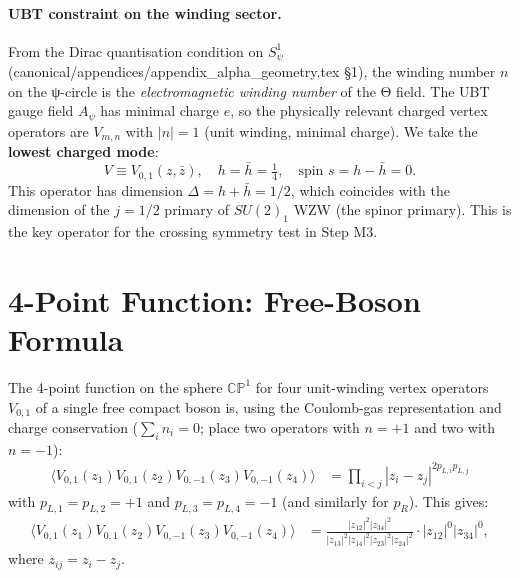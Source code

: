 \documentclass[12pt,a4paper]{article}
\theoremstyle{definition}
\theoremstyle{remark}
\begin{document}
\paragraph{UBT constraint on the winding sector.}
From the Dirac quantisation condition on $S^1_\psi$
(canonical/appendices/appendix\_alpha\_geometry.tex \S1), the winding number
$n$ on the ψ-circle is the \emph{electromagnetic winding number} of the
Θ field.  The UBT gauge field $A_\psi$ has minimal charge $e$, so the
physically relevant charged vertex operators are $V_{m,n}$ with $|n| = 1$
(unit winding, minimal charge).  We take the \textbf{lowest charged mode}:
\begin{equation}
  V \equiv V_{0,1}(z, \bar{z}),
  \quad h = \bar{h} = \tfrac{1}{4},
  \quad \text{spin } s = h - \bar{h} = 0.
  \label{eq:m2:lowestmode}
\end{equation}
This operator has dimension $\Delta = h + \bar{h} = 1/2$, which coincides with
the dimension of the $j = 1/2$ primary of $SU(2)_1$ WZW (the spinor primary).
This is the key operator for the crossing symmetry test in Step M3.

\section{4-Point Function: Free-Boson Formula}
\label{sec:m2:4point}

The 4-point function on the sphere $\mathbb{CP}^1$ for four unit-winding
vertex operators $V_{0,1}$ of a single free compact boson is, using the
Coulomb-gas representation and charge conservation
($\sum_i n_i = 0$; place two operators with $n = +1$ and two with $n = -1$):
\begin{align}
  \bigl\langle V_{0,1}(z_1) V_{0,1}(z_2) V_{0,-1}(z_3) V_{0,-1}(z_4)
  \bigr\rangle
  &= \prod_{i < j} |z_i - z_j|^{2 p_{L,i} p_{L,j}}
  \label{eq:m2:4point_raw}
\end{align}
with $p_{L,1} = p_{L,2} = +1$ and $p_{L,3} = p_{L,4} = -1$ (and similarly for
$p_R$).  This gives:
\begin{align}
  \bigl\langle V_{0,1}(z_1) V_{0,1}(z_2) V_{0,-1}(z_3) V_{0,-1}(z_4)
  \bigr\rangle
  &= \frac{|z_{12}|^{2} |z_{34}|^{2}}{|z_{13}|^{2} |z_{14}|^{2}
                                         |z_{23}|^{2} |z_{24}|^{2}}
    \cdot |z_{12}|^0 |z_{34}|^0,
  \label{eq:m2:4point_boson}
\end{align}
where $z_{ij} = z_i - z_j$.
\end{document}
